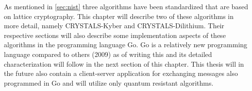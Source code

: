 As mentioned in \ref{sec:nist} three algorithms have been standardized that are based on lattice cryptography. This chapter will describe two of these algorithms in more detail, namely CRYSTALS-Kyber and CRYSTALS-Dilithium. Their respective sections will also describe some implementation aspects of these algorithms in the programming language Go. Go is a relatively new programming language compared to others (2009) as of writing this \cite{Donovan2016} and its detailed characterization will follow in the next section of this chapter. This thesis will in the future also contain a client-server application for exchanging messages also programmed in Go and will utilize only quantum resistant algorithms.
